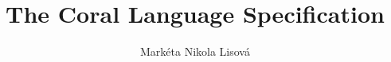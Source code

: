 \documentclass[12pt,a4paper,twoside,titlepage]{book}
\begin{document}
\frontmatter
\title{The Coral Language Specification}
\author{Markéta Nikola Lisová}
\maketitle
\clearemptydoublepage
\tableofcontents

\mainmatter
\sloppy


\end{document}
